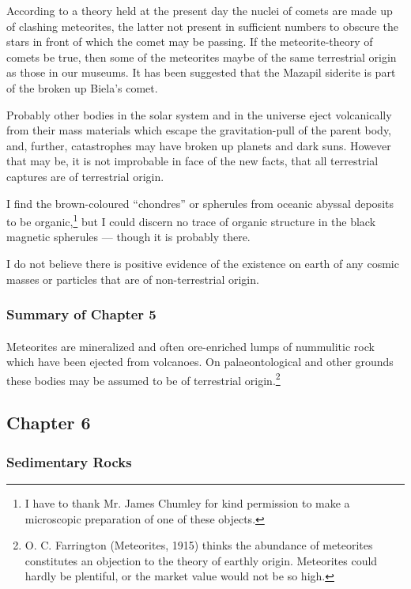 \documentclass[a4paper, 12pt, oneside]{article}
\begin{document}
According to a theory held at the present day the nuclei of comets are made up of clashing meteorites, the latter not present in sufficient numbers to obscure the stars in front of which the comet may be passing. If the meteorite-theory of comets be true, then some of the meteorites maybe of the same terrestrial origin as those in our museums. It has been suggested that the Mazapil siderite is part of the broken up Biela's comet.

Probably other bodies in the solar system and in the universe eject volcanically from their mass materials which escape the gravitation-pull of the parent body, and, further, catastrophes may have broken up planets and dark suns. However that may be, it is not improbable in face of the new facts, that all terrestrial captures are of terrestrial origin.

I find the brown-coloured ``chondres'' or spherules from oceanic abyssal deposits to be organic,\footnote{I have to thank Mr. James Chumley for kind permission to make a microscopic preparation of one of these objects.} but I could discern no trace of organic structure in the black magnetic spherules --- though it is probably there.

I do not believe there is positive evidence of the existence on earth of any cosmic masses or particles that are of non-terrestrial origin.

\subsubsection{Summary of Chapter 5}
\paragraph{}
Meteorites are mineralized and often ore-enriched lumps of nummulitic rock which have been ejected from volcanoes. On palaeontological and other grounds these bodies may be assumed to be of terrestrial origin.\footnote{O. C. Farrington (Meteorites, 1915) thinks the abundance of meteorites constitutes an objection to the theory of earthly origin. Meteorites could hardly be plentiful, or the market value would not be so high.}
\clearpage
\subsection{Chapter 6}
\subsubsection{Sedimentary Rocks}
\end{document}
